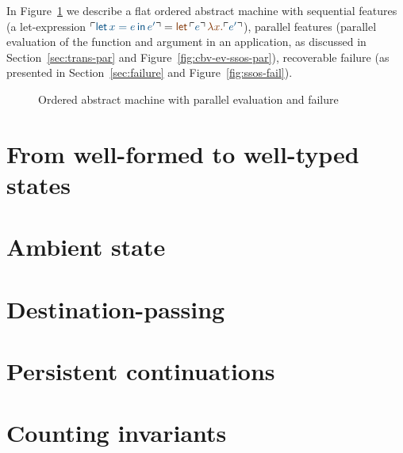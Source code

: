 In Figure~\ref{fig:gen-order-prog} we describe a flat ordered abstract
machine with sequential features (a let-expression $\interp{{\sf
    let}\,x = e\,{\sf in}\,e'} = \lf{{\sf let}\,\interp{e}\,\lambda
  x.\interp{e'}}$), parallel features (parallel evaluation of the
function and argument in an application, as discussed in
Section~\ref{sec:trans-par} and Figure~\ref{fig:cbv-ev-ssos-par}),
recoverable failure (as presented in Section~\ref{sec:failure} and
Figure~\ref{fig:ssos-fail}).

\begin{figure}[tp]
\caption{Ordered abstract machine with parallel evaluation and failure}
\label{fig:gen-order-prog}
\end{figure}


\section{From well-formed to well-typed states}
\label{sec:gen-ordertp}

\section{Ambient state}
\label{sec:gen-state}





\section{Destination-passing}
\label{sec:gen-destinations}


\section{Persistent continuations}
\label{sec:gen-letcc}

\section{Counting invariants}
\label{sec:gen-count}



\label{sec:pointer-inequality}

